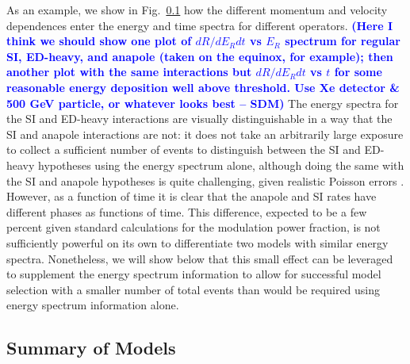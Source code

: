 \documentclass[11pt]{article}
\newcommand{\Fig}[1]{Fig.~\ref{#1}} \newcommand{\Figs}[2]{Figs.~\ref{#1} and \ref{#2}}
\newcommand{\sdm}[1]{\textcolor{blue}{\textbf{(#1 -- SDM)}}}
\begin{document}
As an example, we show in \Fig{} how the different momentum and velocity dependences enter the energy and time spectra for different operators. \sdm{Here I think we should show one plot of $dR/dE_R dt$ vs $E_R$ spectrum for regular SI, ED-heavy, and anapole (taken on the equinox, for example); then another plot with the same interactions but $dR/dE_R dt$ vs $t$ for some reasonable energy deposition well above threshold. Use Xe detector \& 500 GeV particle, or whatever looks best} The energy spectra for the SI and ED-heavy interactions are visually distinguishable in a way that the SI and anapole interactions are not: it does not take an arbitrarily large exposure to collect a sufficient number of events to distinguish between the SI and ED-heavy hypotheses using the energy spectrum alone, although doing the same with the SI and anapole hypotheses is quite challenging, given realistic Poisson errors \cite{Gluscevic:2015sqa}. However, as a function of time it is clear that the anapole and SI rates have different phases as functions of time. This difference, expected to be a few percent given standard calculations for the modulation power fraction, is not sufficiently powerful on its own to differentiate two models with similar energy spectra. Nonetheless, we will show below that this small effect can be leveraged to supplement the energy spectrum information to allow for successful model selection with a smaller number of total events than would be required using energy spectrum information alone.

\subsection{Summary of Models}
\end{document}
